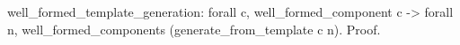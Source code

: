 well_formed_template_generation:
 forall c, well_formed_component c ->
 forall n, well_formed_components (generate_from_template c n).
Proof.